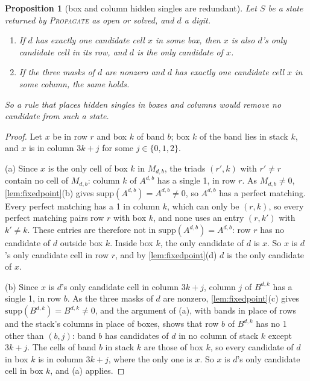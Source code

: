 \documentclass[11pt]{article}
\newtheorem{proposition}[theorem]{Proposition}
\theoremstyle{definition}
\theoremstyle{plain}
\let\origtextsc\textsc
\renewcommand{\textsc}[1]{\textup{\origtextsc{#1}}}
\begin{document}
\begin{proposition}[box and column hidden singles are redundant]
\label{prop:hidden}
Let $S$ be a state returned by \textsc{Propagate} as \emph{open} or \emph{solved}, and $d$ a digit.
\begin{enumerate}
\item[(a)] If $d$ has exactly one candidate cell $x$ in some box, then $x$ is also $d$'s only candidate cell in its
  row, and $d$ is the only candidate of $x$.
\item[(b)] If the three masks of $d$ are nonzero and $d$ has exactly one candidate cell $x$ in some column, the same
  holds.
\end{enumerate}
So a rule that places hidden singles in boxes and columns would remove no candidate from such a state.
\end{proposition}
\begin{proof}
Let $x$ be in row $r$ and box $k$ of band $b$; box $k$ of the band lies in stack $k$, and $x$ is in column $3k+j$ for
some $j\in\{0,1,2\}$.

(a) Since $x$ is the only cell of box $k$ in $M_{d,b}$, the triads $(r',k)$ with $r'\neq r$ contain no cell of
$M_{d,b}$: column $k$ of $A^{d,b}$ has a single 1, in row $r$. As $M_{d,b}\neq 0$, \cref{lem:fixedpoint}(b) gives
$\mathrm{supp}(A^{d,b})=A^{d,b}\neq 0$, so $A^{d,b}$ has a perfect matching. Every perfect matching has a 1 in column $k$,
which can only be $(r,k)$, so every perfect matching pairs row $r$ with box $k$, and none uses an entry $(r,k')$ with
$k'\neq k$. These entries are therefore not in $\mathrm{supp}(A^{d,b})=A^{d,b}$: row $r$ has no candidate of $d$
outside box $k$. Inside box $k$, the only candidate of $d$ is $x$. So $x$ is $d$'s only candidate cell in row $r$, and
by \cref{lem:fixedpoint}(d) $d$ is the only candidate of $x$.

(b) Since $x$ is $d$'s only candidate cell in column $3k+j$, column $j$ of $B^{d,k}$ has a single 1, in row $b$. As the
three masks of $d$ are nonzero, \cref{lem:fixedpoint}(c) gives $\mathrm{supp}(B^{d,k})=B^{d,k}\neq 0$, and the
argument of (a), with bands in place of rows and the stack's columns in place of boxes, shows that row $b$ of
$B^{d,k}$ has no 1 other than $(b,j)$: band $b$ has candidates of $d$ in no column of stack $k$ except $3k+j$. The
cells of band $b$ in stack $k$ are those of box $k$, so every candidate of $d$ in box $k$ is in column $3k+j$, where the
only one is $x$. So $x$ is $d$'s only candidate cell in box $k$, and (a) applies.
\end{proof}
\end{document}
